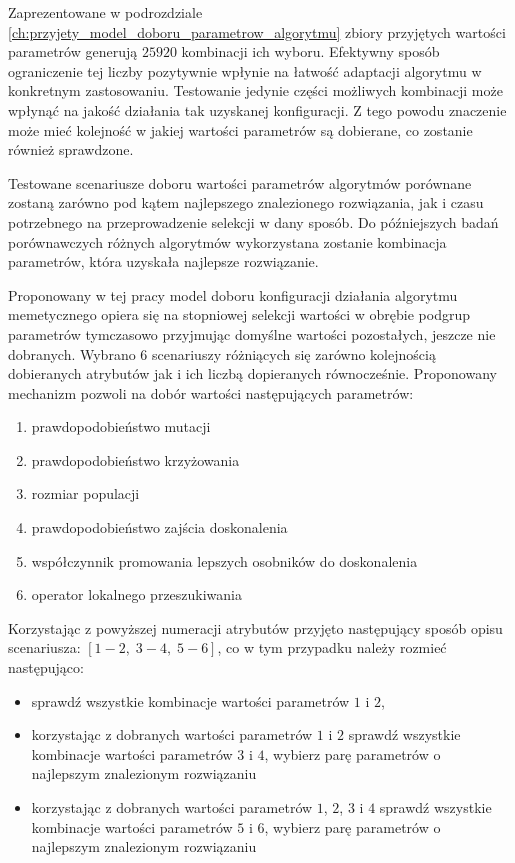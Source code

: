 \par
Zaprezentowane w podrozdziale \ref{ch:przyjety_model_doboru_parametrow_algorytmu} zbiory przyjętych wartości parametrów generują $25920$ kombinacji ich wyboru. Efektywny sposób ograniczenie tej liczby pozytywnie wpłynie na łatwość adaptacji algorytmu w konkretnym zastosowaniu. Testowanie jedynie części możliwych kombinacji może wpłynąć na jakość działania tak uzyskanej konfiguracji. Z tego powodu znaczenie może mieć kolejność w jakiej wartości parametrów są dobierane, co zostanie również sprawdzone. 
\par
Testowane scenariusze doboru wartości parametrów algorytmów porównane zostaną zarówno pod kątem najlepszego znalezionego rozwiązania, jak i czasu potrzebnego na przeprowadzenie selekcji w dany sposób. Do późniejszych badań porównawczych różnych algorytmów wykorzystana zostanie kombinacja parametrów, która uzyskała najlepsze rozwiązanie. 
\par
Proponowany w tej pracy model doboru konfiguracji działania algorytmu memetycznego opiera się na stopniowej selekcji wartości w obrębie podgrup parametrów tymczasowo przyjmując domyślne wartości pozostałych, jeszcze nie dobranych. Wybrano 6 scenariuszy różniących się zarówno kolejnością dobieranych atrybutów jak i ich liczbą dopieranych równocześnie. Proponowany mechanizm pozwoli na dobór wartości następujących parametrów:
\begin{enumerate}
\item prawdopodobieństwo mutacji
\item prawdopodobieństwo krzyżowania
\item rozmiar populacji
\item prawdopodobieństwo zajścia doskonalenia
\item współczynnik promowania lepszych osobników do doskonalenia
\item operator lokalnego przeszukiwania
\end{enumerate}
Korzystając z powyższej numeracji atrybutów przyjęto następujący sposób opisu scenariusza: $[1-2,\; 3-4,\; 5-6]$, co w tym przypadku należy rozmieć następująco:
\begin{itemize}
\item sprawdź wszystkie kombinacje wartości parametrów $1$ i $2$, 
\item korzystając z dobranych wartości parametrów $1$ i $2$ sprawdź wszystkie kombinacje wartości parametrów $3$ i $4$, wybierz parę parametrów o najlepszym znalezionym rozwiązaniu
\item korzystając z dobranych wartości parametrów $1$, $2$, $3$ i $4$ sprawdź wszystkie kombinacje wartości parametrów $5$ i $6$, wybierz parę parametrów o najlepszym znalezionym rozwiązaniu
\end{itemize}
